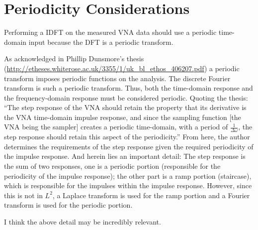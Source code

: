 \section{Periodicity Considerations}
\label{sec:periodicity_considerations}

\begin{framed}
   Performing a IDFT on the measured VNA data should use a periodic time-domain
   input because the DFT is a periodic transform.
\end{framed}

As acknowledged in Phillip Dunsmore's thesis
(\url{http://etheses.whiterose.ac.uk/3355/1/uk_bl_ethos_406207.pdf}) a periodic
transform imposes periodic functions on the analysis. The discrete Fourier
transform is such a periodic transform. Thus, both the time-domain response and
the frequency-domain response must be considered periodic. Quoting the thesis:
``The step response of the VNA should retain the property that its derivative is
the VNA time-domain impulse response, and since the sampling function [the VNA
being the sampler] creates a periodic time-domain, with a period of $
\frac{1}{\Delta \omega} $, the step response should retain this aspect of the
periodicity.'' From here, the author determines the requirements of the step
response given the required periodicity of the impulse response. And herein lies
an important detail: The step response is the sum of two responses, one is a
periodic portion (responsible for the periodicity of the impulse response); the
other part is a ramp portion (staircase), which is responsible for the impulses
within the impulse response. However, since this is not in $ L^2 $, a Laplace
transform is used for the ramp portion and a Fourier transform is used for the
periodic portion.

I think the above detail may be incredibly relevant.
